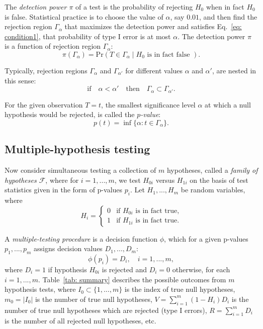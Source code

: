 \documentclass[10pt]{article}
\begin{document}
The {\it detection power $\pi$} of a test is the probability of rejecting $H_{0}$ when in fact $H_{0}$ is false. Statistical practice is to choose the value of $\alpha$, say $0.01$, and then find the rejection region $\Gamma_{\alpha}$ that maximizes the detection power and satisfies Eq.~\ref{eq: condition1}, that probability of type I error is at most $\alpha$. The detection power $\pi$ is a function of rejection region $\Gamma_{\alpha}$:
\begin{equation}
	\pi(\Gamma_{\alpha}) = \text{Pr}(T \in \Gamma_{\alpha} \mid H_{0} \text{ is in fact false }).
\end{equation}

Typically, rejection regions $\Gamma_{\alpha}$ and $\Gamma_{\alpha'}$ for different values $\alpha$ and $\alpha'$, are nested in this sense:
\begin{equation} \label{eq: nesting}
	\text{if} \quad \alpha < \alpha' \quad \text{then} \quad \Gamma_{\alpha} \subset \Gamma_{\alpha'}.
\end{equation}


For the given observation $T = t$, the smallest significance level $\alpha$ at which a null hypothesis would be rejected, is called the {\it $p$-value}:
\begin{equation}
	p(t) = \inf \lbrace \alpha : t \in \Gamma_{\alpha} \rbrace.
\end{equation}


\subsection{Multiple-hypothesis testing}
Now consider simultaneous testing a collection of $m$ hypotheses, called a {\it family of hypotheses $\mathcal{F}$}, where for $i = 1, ..., m$, we test $H_{0i}$ versus $H_{1i}$ on the basis of test statistics given in the form of p-values $p_{i}$. Let $H_{1}, ...,H_{m}$ be random variables, where 
\[
	H_{i} = \begin{cases}
		0 & \text{if $H_{0i}$ is in fact true,}\\
		1 & \text{if $H_{1i}$ is in fact true.}
	\end{cases}
\]

A {\it multiple-testing procedure} is a decision function $\phi$, which for a given p-values $p_{1}, ..., p_{m}$ assigns decision values $D_{1}, ..., D_{m}$: 
\begin{equation}
\phi(p_{i}) = D_{i}, \quad i = 1,..., m,
\end{equation}
where $D_{i} = 1$ if hypothesis $H_{0i}$ is rejected and $D_{i} = 0$ otherwise, for each $i = 1,..., m$. Table~\ref{tab: summary} describes the possible outcomes from $m$ hypothesis tests, where $I_{0} \subset \lbrace 1, ..., m \rbrace$ is the index of true null hypotheses, $m_{0} = |I_{0}|$ is the number of true null hypotheses, $V = \sum_{i=1}^{m} (1 - H_{i}) D_{i}$ is the number of true null hypotheses which are rejected (type I errors), $R = \sum_{i=1}^{m} D_{i}$ is the number of all rejected null hypotheses, etc. 
\end{document}
